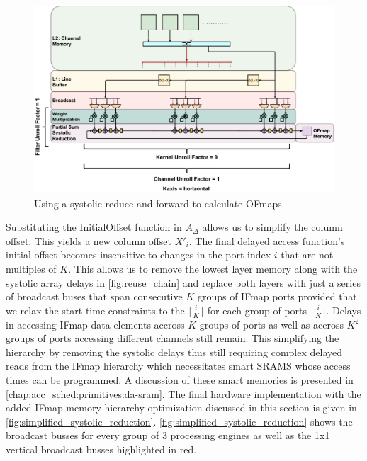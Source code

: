 \begin{figure}[]
    \centering
    \includegraphics[scale=0.36]{fig/hybrid3x3Gemm.pdf}
    \caption{Using a systolic reduce and forward to calculate OFmaps}
    \label{fig:simplified_systolic_reduction}
\end{figure}

Substituting the InitialOffset function in $A_\Delta$  allows us to simplify the
column offset. This yields a new column offset $X'_i$. The final delayed access
function's initial offset becomes insensitive to changes in the port index $i$
that are not multiples of $K$. This allows us to remove the lowest layer memory
along with the systolic array delays in \autoref{fig:reuse_chain} and replace
both layers with just a series of broadcast buses that span consecutive $K$
groups of IFmap ports provided that we relax the start time constraints to the
$\lceil \frac{i}{K} \rceil$ for each group of ports $\lfloor \frac{i}{K}
\rfloor$. Delays in accessing IFmap data elements accross $K$ groups of ports
as well as accross $K^2$ groups of ports accessing different channels still
remain. This simplifying the hierarchy by removing the systolic delays thus still
requiring complex delayed reads from the IFmap hierarchy which necessitates smart
SRAMS whose access times can be programmed. A discussion of these smart memories
is presented in \autoref{chap:acc_sched:primitives:da-sram}. The final
hardware implementation with the added IFmap memory hierarchy optimization
discussed in this section is given in
\autoref{fig:simplified_systolic_reduction}.
\autoref{fig:simplified_systolic_reduction} shows the broadcast busses for every
group of 3 processing engines as well as the 1x1 vertical broadcast busses
highlighted in red. 

